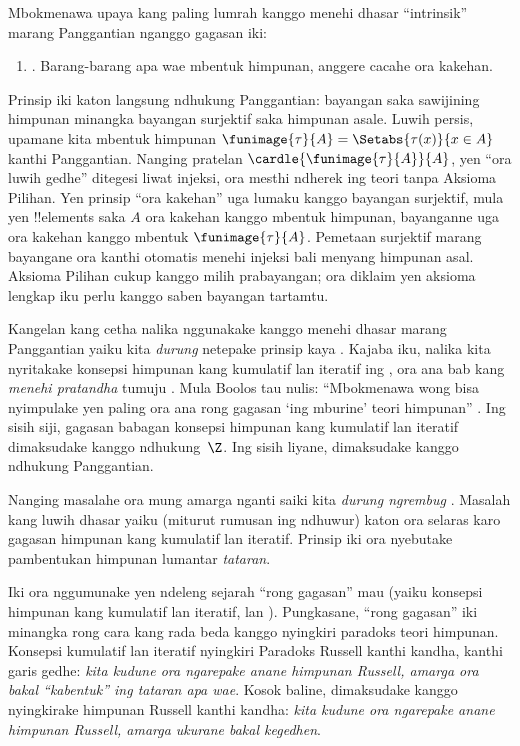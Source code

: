 \documentclass[../../../include/open-logic-section]{subfiles}
\begin{document}

Mbokmenawa upaya kang paling lumrah kanggo
menehi dhasar ``intrinsik'' marang Panggantian
nganggo gagasan iki:
\begin{enumerate}
	\item[] \limofsize. Barang-barang apa wae
	mbentuk himpunan, anggere cacahe ora kakehan.
\end{enumerate}
Prinsip iki katon langsung ndhukung Panggantian:
bayangan saka sawijining himpunan minangka bayangan
surjektif saka himpunan asale. Luwih persis,
upamane kita mbentuk himpunan
$\funimage{\tau}{A} = \Setabs{\tau(x)}{x \in A}$
kanthi Panggantian. Nanging pratelan
$\cardle{\funimage{\tau}{A}}{A}$, yen
``ora luwih gedhe'' ditegesi liwat injeksi,
ora mesthi ndherek ing teori tanpa Aksioma Pilihan. Yen prinsip
``ora kakehan'' uga lumaku kanggo bayangan surjektif,
mula yen !!{element}s saka $A$ ora kakehan kanggo
mbentuk himpunan, bayanganne uga ora kakehan
kanggo mbentuk $\funimage{\tau}{A}$.
Pemetaan surjektif marang bayangane ora kanthi otomatis menehi injeksi bali menyang himpunan asal. Aksioma Pilihan cukup kanggo milih prabayangan; ora diklaim yen aksioma lengkap iku perlu kanggo saben bayangan tartamtu.

Kangelan kang cetha nalika nggunakake
\limofsize{} kanggo menehi dhasar marang
Panggantian yaiku kita \emph{durung} netepake
prinsip kaya \limofsize. Kajaba iku, nalika
kita nyritakake konsepsi himpunan kang
kumulatif lan iteratif ing
, ora
ana bab kang \emph{menehi pratandha} tumuju
\limofsize. Mula Boolos tau nulis:
``Mbokmenawa wong bisa nyimpulake yen paling
ora ana rong gagasan `ing mburine' teori
himpunan'' \citeyearpar[p.~19]{Boolos1989}.
Ing sisih siji, gagasan babagan konsepsi
himpunan kang kumulatif lan iteratif dimaksudake
kanggo ndhukung~$\Z$. Ing sisih liyane,
\limofsize{} dimaksudake kanggo ndhukung
Panggantian.

Nanging masalahe ora mung amarga nganti saiki
kita \emph{durung ngrembug} \limofsize. Masalah
kang luwih dhasar yaiku \limofsize{} (miturut
rumusan ing ndhuwur) katon ora selaras karo
gagasan himpunan kang kumulatif lan iteratif.
Prinsip iki ora nyebutake pambentukan himpunan
lumantar \emph{tataran}.

Iki ora nggumunake yen ndeleng sejarah ``rong
gagasan'' mau (yaiku konsepsi himpunan kang
kumulatif lan iteratif, lan \limofsize).
Pungkasane, ``rong gagasan'' iki minangka
rong cara kang rada beda kanggo nyingkiri
paradoks teori himpunan. Konsepsi kumulatif
lan iteratif nyingkiri Paradoks Russell kanthi
kandha, kanthi garis gedhe:
\emph{kita kudune ora ngarepake anane himpunan
Russell, amarga ora bakal ``kabentuk'' ing
tataran apa wae}. Kosok baline, \limofsize{}
dimaksudake kanggo nyingkirake himpunan
Russell kanthi kandha:
\emph{kita kudune ora ngarepake anane himpunan
Russell, amarga ukurane bakal kegedhen}.
\end{document}
